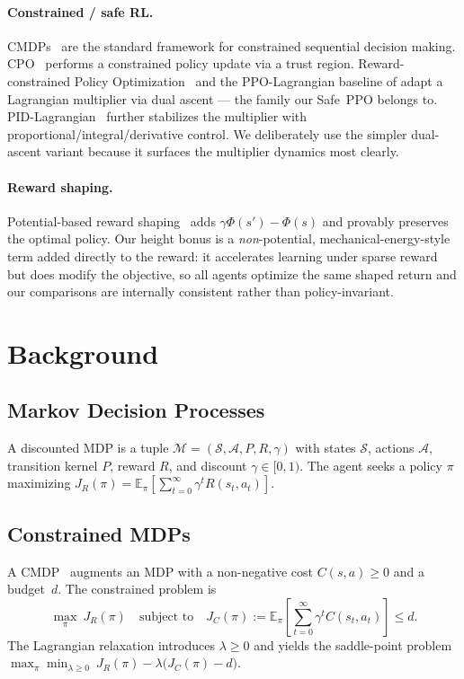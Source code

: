 \documentclass{article}
\begin{document}
\paragraph{Constrained / safe RL.} CMDPs~\citep{altman1999cmdp} are the standard framework for
constrained sequential decision making. CPO~\citep{achiam2017cpo} performs a constrained policy
update via a trust region. Reward-constrained Policy Optimization~\citep{tessler2018reward} and
the PPO-Lagrangian baseline of \citet{ray2019benchmarking} adapt a Lagrangian multiplier via
dual ascent --- the family our Safe~PPO belongs to. PID-Lagrangian~\citep{stooke2020responsive}
further stabilizes the multiplier with proportional/integral/derivative control. We deliberately
use the simpler dual-ascent variant because it surfaces the multiplier dynamics most clearly.

\paragraph{Reward shaping.} Potential-based reward shaping~\citep{ng1999rewardshaping} adds
$\gamma\Phi(s')-\Phi(s)$ and provably preserves the optimal policy. Our height bonus is a
\emph{non}-potential, mechanical-energy-style term added directly to the reward: it accelerates
learning under sparse reward but does modify the objective, so all agents optimize the same
shaped return and our comparisons are internally consistent rather than policy-invariant.


\section{Background}
\label{sec:background}

\subsection{Markov Decision Processes}
A discounted MDP is a tuple $\mathcal{M} = (\mathcal{S}, \mathcal{A}, P, R, \gamma)$ with
states $\mathcal{S}$, actions $\mathcal{A}$, transition kernel $P$, reward $R$, and discount
$\gamma \in [0,1)$. The agent seeks a policy $\pi$ maximizing
$J_R(\pi) = \mathbb{E}_{\pi}\!\left[\sum_{t=0}^{\infty} \gamma^t R(s_t, a_t)\right]$.

\subsection{Constrained MDPs}
A CMDP~\citep{altman1999cmdp} augments an MDP with a non-negative cost $C(s,a) \ge 0$ and a
budget~$d$. The constrained problem is
\begin{equation}
\label{eq:cmdp}
\max_{\pi}\ J_R(\pi) \quad \text{subject to} \quad
J_C(\pi) := \mathbb{E}_{\pi}\!\left[\sum_{t=0}^{\infty} \gamma^t C(s_t, a_t)\right] \le d.
\end{equation}
The Lagrangian relaxation introduces $\lambda \ge 0$ and yields the saddle-point problem
$\max_\pi \min_{\lambda \ge 0}\ J_R(\pi) - \lambda \bigl(J_C(\pi) - d\bigr)$.
\end{document}
